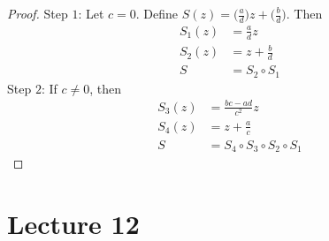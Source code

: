 \documentclass[12pt]{article}
\begin{document}
\begin{proof} Step $1$: Let $c =0$. Define $S(z) = \Big( \frac{a}{d}\Big)z + \Big( \frac{b}{d}\Big)$. Then $$ \begin{aligned} S_1(z) &= \frac{a}{d}z \\ S_2(z) &= z + \frac{b}{d} \\ S &= S_2 \circ S_1 \end{aligned} $$ 
Step $2$: If $c \neq 0$, then $$ \begin{aligned} S_3(z) &= \frac{bc-ad}{c^2}z \\ S_4(z) &= z + \frac{a}{c} \\ S &= S_4 \circ S_3 \circ S_2 \circ S_1 \end{aligned} $$ \end{proof}

\section{Lecture 12} 
\end{document}
